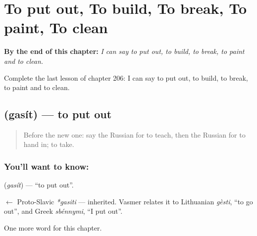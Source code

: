 
\chapter{To put out, To build, To break, To paint, To clean}
\label{ch:ru-to-put-out-to-build-to-break-to-paint-to-clean}

\begin{chapteropening}
\textbf{By the end of this chapter:} \emph{I can say to put out, to build, to break, to paint and to clean.}

Complete the last lesson of chapter 206: I can say to put out, to build, to break, to paint and to clean.
\end{chapteropening}

\section[\texorpdfstring{\ru{гасить} (gasít)}{гасить (gasít)}]{ (gasít) — to put out}

\label{lesson:RU-C206-gasit}



\begin{quote}
Before the new one: say the Russian for to teach, then the Russian for to hand in; to take.
\end{quote}

\subsection*{You'll want to know: }
\textbf{} (\emph{gasít}) — \textquotedblleft{}to put out\textquotedblright{}.

\begin{cousinweb}
\textbf{} $\leftarrow$ Proto-Slavic \emph{*gasiti} — inherited. Vasmer relates it to Lithuanian \emph{gèsti}, \textquotedblleft{}to go out\textquotedblright{}, and Greek \emph{sbénnymi}, \textquotedblleft{}I put out\textquotedblright{}.
\end{cousinweb}

\begin{grammarlens}[title={What you've built}]
One more word for this chapter.
\end{grammarlens}

